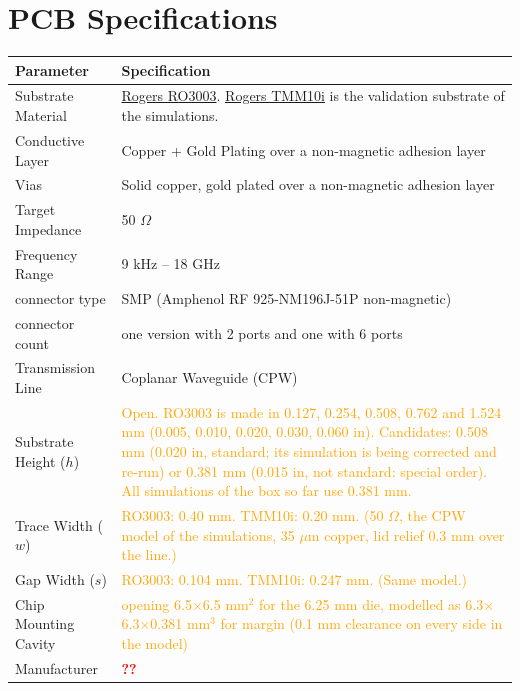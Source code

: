 \section{PCB Specifications}

\begin{table}[h!]
\centering
\begin{tabular}{l|p{}}
\toprule
\textbf{Parameter} & \textbf{Specification} \\ \bottomrule
Substrate Material & \hyperref[subsec:selectedPCBsubstrate]{Rogers RO3003}. \hyperref[subsec:TMM10i]{Rogers TMM10i} is the validation substrate of the simulations. \\
Conductive Layer & Copper + Gold Plating over a non-magnetic adhesion layer\footnotemark \\
Vias & Solid copper, gold plated over a non-magnetic adhesion layer \\
Target Impedance & 50 $\Omega$ \\
Frequency Range & 9 kHz -- 18 GHz\ \footnotemark\\
connector type & SMP (Amphenol RF 925-NM196J-51P non-magnetic) \\
connector count & one version with 2 ports and one with 6 ports \\
Transmission Line & Coplanar Waveguide (CPW) \\
\quad Substrate Height ($h$) & \textcolor{orange}{Open. RO3003 is made in 0.127, 0.254, 0.508, 0.762 and 1.524 mm (0.005, 0.010, 0.020, 0.030, 0.060 in). Candidates: 0.508 mm (0.020 in, standard; its simulation is being corrected and re-run) or 0.381 mm (0.015 in, not standard: special order). All simulations of the box so far use 0.381 mm.} \\
\quad Trace Width ($w$) & \textcolor{orange}{RO3003: 0.40 mm. TMM10i: 0.20 mm. (50 $\Omega$, the CPW model of the simulations, 35 $\mu$m copper, lid relief 0.3 mm over the line.)} \\
\quad Gap Width ($s$) & \textcolor{orange}{RO3003: 0.104 mm. TMM10i: 0.247 mm. (Same model.)} \\
Chip Mounting Cavity &\textcolor{orange}{opening 6.5$\times$6.5 mm$^2$ for the 6.25 mm die, modelled as 6.3$\times$6.3$\times$0.381 mm$^3$ for margin (0.1 mm clearance on every side in the model)\ \footnotemark}\\
Manufacturer & \textcolor{red}{\textbf{??}} \\
\bottomrule
\end{tabular}
\end{table}


